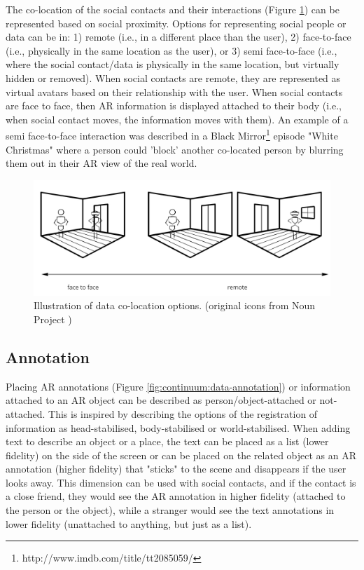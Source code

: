 The co-location of the social contacts and their interactions (Figure \ref{fig:continuum:data-colocation}) can be represented based on social proximity. Options for representing social people or data can be in: 
1) remote (i.e., in a different place than the user), 
2) face-to-face (i.e., physically in the same location as the user), or 
3) semi face-to-face (i.e., where the social contact/data is physically in the same location, but virtually hidden or removed). When social contacts are remote, they are represented as virtual avatars based on their relationship with the user. When social contacts are face to face, then AR information is displayed attached to their body (i.e., when social contact moves, the information moves with them). 
An example of a semi face-to-face interaction was described in a Black Mirror\footnote{http://www.imdb.com/title/tt2085059/} episode "White Christmas" where a person could 'block' another co-located person by blurring them out in their AR view of the real world.

\begin{figure}[ht]
    \centering
    \includegraphics[width=0.8\linewidth]{images/30-continuum/continuum-colocation.jpg}
    \caption{Illustration of data co-location options. (original icons from Noun Project \cite{TheNounProjectInc.})}
    \label{fig:continuum:data-colocation}
\end{figure}

\subsection{Annotation}

Placing AR annotations (Figure \ref{fig:continuum:data-annotation}) or information attached to an AR object can be described as person/object-attached or not-attached. 
This is inspired by \textcite{Billinghurst1998} describing the options of the registration of information as head-stabilised, body-stabilised or world-stabilised. 
When adding text to describe an object or a place, the text can be placed as a list (lower fidelity) on the side of the screen or can be placed on the related object as an AR annotation (higher fidelity) that "sticks" to the scene and disappears if the user looks away. 
This dimension can be used with social contacts, and if the contact is a close friend, they would see the AR annotation in higher fidelity (attached to the person or the object), while a stranger would see the text annotations in lower fidelity (unattached to anything, but just as a list). 

